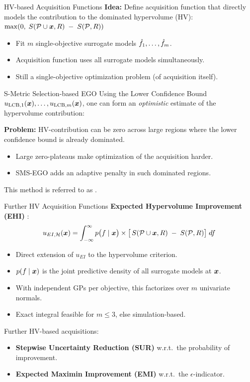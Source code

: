 \documentclass[11pt,compress,t,notes=noshow,xcolor=table]{beamer}
\begin{document}
\begin{framev}{HV-based Acquisition Functions}
\textbf{Idea:} Define acquisition function that directly models the contribution to the dominated hypervolume (HV):
$\max(0, \; S(\mathcal{P} \cup \bm{x}, R) \;-\; S(\mathcal{P}, R))$
\begin{center}
\end{center}
\begin{itemize}
\item Fit $m$ single-objective surrogate models $\hat{f}_1, \dots, \hat{f}_m$.
\item Acquisition function uses all surrogate models simultaneously.
\item Still a single-objective optimization problem (of acquisition itself).
\end{itemize}
\end{framev}


\begin{framev}{S-Metric Selection-based EGO}
Using the Lower Confidence Bound $u_{\text{LCB},1}(\bm{x}),\dots,u_{\text{LCB},m}(\bm{x})$,
one can form an \emph{optimistic} estimate of the hypervolume contribution:
\begin{center}
\end{center}
\textbf{Problem:} HV-contribution can be zero across large regions where the lower confidence bound is already dominated.
\begin{itemize}
\item Large zero-plateaus make optimization of the acquisition harder.
\item SMS-EGO adds an adaptive penalty in such dominated regions.
\end{itemize}
\spacer
This method is referred to as
.
\end{framev}


\begin{framev}{Further HV Acquisition Functions}
\textbf{Expected Hypervolume Improvement (EHI)} 
:
$$
u_{EI, \mathcal{H}}(\bm{x}) 
= \int_{-\infty}^{\infty} p\bigl(f \mid \bm{x}\bigr)
\times \bigl[\,
S(\mathcal{P} \cup \bm{x}, R) \;-\; S(\mathcal{P}, R)
\bigr]\; df
$$
\begin{itemize}
\item Direct extension of $u_{EI}$ to the hypervolume criterion.
\item $p(f \mid \bm{x})$ is the joint predictive density of all surrogate models at $\bm{x}$.
\item With independent GPs per objective, this factorizes over $m$ univariate normals.
\item Exact integral feasible for $m \le 3$, else simulation-based.
\end{itemize}
\spacer
Further HV-based acquisitions:
\begin{itemize}
\item \textbf{Stepwise Uncertainty Reduction (SUR)} w.r.t.\ the probability of improvement.
\item \textbf{Expected Maximin Improvement (EMI)} w.r.t.\ the $\epsilon$-indicator.
\end{itemize}
\end{framev}
\end{document}

